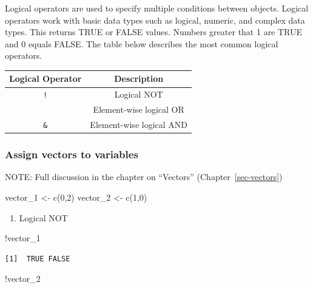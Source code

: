 \documentclass[
  letterpaper,
  DIV=11,
  numbers=noendperiod]{scrreprt}
\newenvironment{Shaded}{\begin{snugshade}}{\end{snugshade}}
\newcommand{\DecValTok}[1]{\textcolor[rgb]{0.68,0.00,0.00}{#1}}
\newcommand{\FunctionTok}[1]{\textcolor[rgb]{0.28,0.35,0.67}{#1}}
\newcommand{\NormalTok}[1]{\textcolor[rgb]{0.00,0.23,0.31}{#1}}
\newcommand{\OtherTok}[1]{\textcolor[rgb]{0.00,0.23,0.31}{#1}}
\newcommand{\SpecialCharTok}[1]{\textcolor[rgb]{0.37,0.37,0.37}{#1}}
\providecommand{\tightlist}{%
  \setlength{\itemsep}{0pt}\setlength{\parskip}{0pt}}\usepackage{longtable,booktabs,array}
\begin{document}
Logical operators are used to specify multiple conditions between
objects. Logical operators work with basic data types such as logical,
numeric, and complex data types. This returns TRUE or FALSE values.
Numbers greater that 1 are TRUE and 0 equals FALSE. The table below
describes the most common logical operators.

\begin{longtable}[]{@{}cc@{}}
\toprule\noalign{}
Logical Operator & Description \\
\midrule\noalign{}
\endhead
\bottomrule\noalign{}
\endlastfoot
\texttt{!} & Logical NOT \\
\texttt{\textbar{}} & Element-wise logical OR \\
\texttt{\&} & Element-wise logical AND \\
\end{longtable}

\subsubsection{Assign vectors to
variables}\label{assign-vectors-to-variables}

NOTE: Full discussion in the chapter on ``Vectors''
(Chapter~\ref{sec-vectors})

\begin{Shaded}
\begin{Highlighting}[]
\NormalTok{vector\_1 }\OtherTok{\textless{}{-}} \FunctionTok{c}\NormalTok{(}\DecValTok{0}\NormalTok{,}\DecValTok{2}\NormalTok{)}
\NormalTok{vector\_2 }\OtherTok{\textless{}{-}} \FunctionTok{c}\NormalTok{(}\DecValTok{1}\NormalTok{,}\DecValTok{0}\NormalTok{)}
\end{Highlighting}
\end{Shaded}

\begin{enumerate}
\def\labelenumi{\alph{enumi}.}
\tightlist
\item
  Logical NOT
\end{enumerate}

\begin{Shaded}
\begin{Highlighting}[]
\SpecialCharTok{!}\NormalTok{vector\_1}
\end{Highlighting}
\end{Shaded}

\begin{verbatim}
[1]  TRUE FALSE
\end{verbatim}

\begin{Shaded}
\begin{Highlighting}[]
\SpecialCharTok{!}\NormalTok{vector\_2}
\end{Highlighting}
\end{Shaded}
\end{document}
